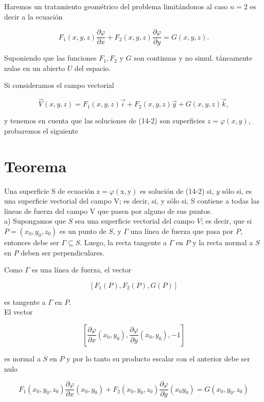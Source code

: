 \documentclass[10pt]{article}
\theoremstyle{plain}
\theoremstyle{definition}
\theoremstyle{remark}
\begin{document}
Haremos un tratamiento geométrico del problema limitándonos al caso $n=2$ es decir a la ecuación



\begin{equation*}
F_{1}(x, y, z) \frac{\partial \varphi}{\partial x}+F_{2}(x, y, z) \frac{\partial \varphi}{\partial y}=G(x, y, z) . \tag{14-2}
\end{equation*}


Suponiendo que las funciones $F_{1}, F_{2}$ y $G$ son continuas y no simul. táneamente nulas en un abierto $U$ del espacio.

Si consideramos el campo vectorial

$$
\vec{V}(x, y, z)=F_{1}(x, y, z) \vec{i}+F_{2}(x, y, z) \vec{y}+G(x, y, z) \vec{k},
$$

y tenemos en cuenta que las soluciones de (14-2) son superficies $z=\varphi(x, y)$, probaremos el siguiente

\section*{Teorema}
Una superficie S de ecuación $\mathrm{z}=\varphi(\mathrm{x}, \mathrm{y})$ es solución de (14-2) si, $y$ sólo si, es una superficie vectorial del campo V; es decir, si, y sólo si, S contiene a todas las lineas de fuerza del campo V que pasen por alguno de sus puntos.\\
a) Supongamos que $S$ sea una superficie vectorial del campo $V$; es decir, que si $P=\left(x_{0}, y_{0}, z_{0}\right)$ es un punto de $S$, y $\Gamma$ una línea de fuerza que pasa por $P$, entonces debe ser $\Gamma \subseteq S$. Luego, la recta tangente a $\Gamma$ en $P$ y la recta normal a $S$ en $P$ deben ser perpendiculares.

Como $\Gamma$ es una línea de fuerza, el vector

$$
\left[F_{1}(P), F_{2}(P), G(P)\right]
$$

es tangente a $\Gamma$ en $P$.\\
El vector

$$
\left[\frac{\partial \varphi}{\partial x}\left(x_{0}, y_{0}\right), \frac{\partial \varphi}{\partial y}\left(x_{0}, y_{0}\right),-1\right]
$$

es normal a $S$ en $P$ y por lo tanto su producto escalar con el anterior debe ser nulo

$$
F_{1}\left(x_{0}, y_{0}, z_{0}\right) \frac{\partial \varphi}{\partial x}\left(x_{0}, y_{0}\right)+F_{2}\left(x_{0}, y_{0}, z_{0}\right) \frac{\partial \varphi}{\partial y}\left(x_{0} y_{0}\right)=G\left(x_{0}, y_{0}, z_{0}\right)
$$
\end{document}
